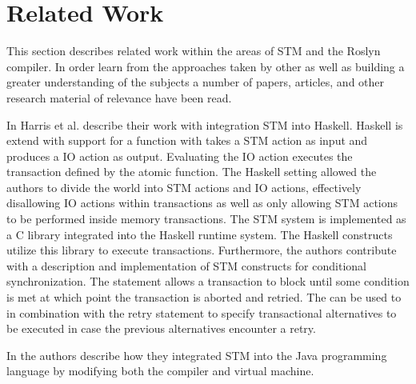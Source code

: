 \makeatletter {}\makeatother
{}

\section{Related Work}
This section describes related work within the areas of \ac{STM} and the Roslyn compiler. In order learn from the approaches taken by other as well as building a greater understanding of the subjects a number of papers, articles, and other research material of relevance have been read. 

In \cite{harris2005composable} Harris et al. describe their work with integration \ac{STM} into Haskell. Haskell is extend with support for a  function with takes a \ac{STM} action as input and produces a \ac{IO} action as output\cite[p. 51]{harris2005composable}. Evaluating the IO action executes the transaction defined by the atomic function. The Haskell setting allowed the authors to divide the world into \ac{STM} actions and \ac{IO} actions\cite{p. 51}, effectively disallowing \ac{IO} actions within transactions as well as only allowing \ac{STM} actions to be performed inside memory transactions. The \ac{STM} system is implemented as a C library integrated into the Haskell runtime system. The Haskell constructs utilize this library to execute transactions\cite[p. 56]{harris2005composable}. Furthermore, the authors contribute with a description and implementation of \ac{STM} constructs for conditional synchronization. The  statement allows a transaction to block until some condition is met at which point the transaction is aborted and retried\cite[p. 52]{harris2005composable}. The  can be used to in combination with the retry statement to specify transactional alternatives to be executed in case the previous alternatives encounter a retry\cite[p. 52]{harris2005composable}.


In \cite{harris2003language} the authors describe how they integrated \ac{STM} into the Java programming language by modifying both the compiler\cite[p. 4]{harris2003language} and virtual machine\cite[p. 9]{harris2003language}.



\worksheetend